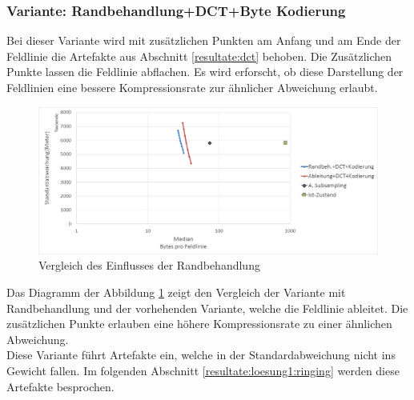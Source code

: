 \subsubsection{Variante: Randbehandlung+DCT+Byte Kodierung} \label{resultate:loesung1:dct:randbeh+byte}
Bei dieser Variante wird mit zusätzlichen Punkten am Anfang und am Ende der Feldlinie die Artefakte aus Abschnitt \ref{resultate:dct} behoben. Die Zusätzlichen Punkte lassen die Feldlinie abflachen. Es wird erforscht, ob diese Darstellung der Feldlinien eine bessere Kompressionsrate zur ähnlicher Abweichung erlaubt. 
\begin{figure}[!htbp]
	\center	\includegraphics[width=1\textwidth,keepaspectratio]{./pictures/resultate/loesung1/loesung1-7/loesung1_7.png}
	\caption{Vergleich des Einflusses der Randbehandlung}
	\label{resultate:loesung1:dct:randbehandlung}
\end{figure}
Das Diagramm der Abbildung \ref{resultate:loesung1:dct:randbehandlung} zeigt den Vergleich der Variante mit Randbehandlung und der vorhehenden Variante, welche die Feldlinie ableitet. Die zusätzlichen Punkte erlauben eine höhere Kompressionsrate zu einer ähnlichen Abweichung.\\
Diese Variante führt Artefakte ein, welche in der Standardabweichung nicht ins Gewicht fallen. Im folgenden Abschnitt \ref{resultate:loesung1:ringing} werden diese Artefakte besprochen.

